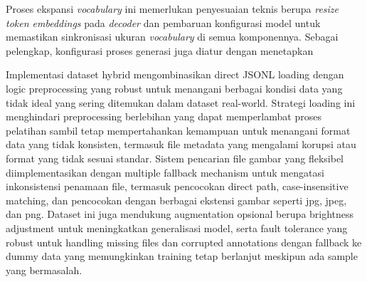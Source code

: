  
Proses ekspansi \textit{vocabulary} ini memerlukan penyesuaian teknis berupa \textit{resize token embeddings} pada \textit{decoder} dan pembaruan konfigurasi model untuk memastikan sinkronisasi ukuran \textit{vocabulary} di semua komponennya. Sebagai pelengkap, konfigurasi proses generasi juga diatur dengan menetapkan 



Implementasi dataset hybrid mengombinasikan direct JSONL loading dengan logic preprocessing yang robust untuk menangani berbagai kondisi data yang tidak ideal yang sering ditemukan dalam dataset real-world. Strategi loading ini menghindari preprocessing berlebihan yang dapat memperlambat proses pelatihan sambil tetap mempertahankan kemampuan untuk menangani format data yang tidak konsisten, termasuk file metadata yang mengalami korupsi atau format yang tidak sesuai standar. Sistem pencarian file gambar yang fleksibel diimplementasikan dengan multiple fallback mechanism untuk mengatasi inkonsistensi penamaan file, termasuk pencocokan direct path, case-insensitive matching, dan pencocokan dengan berbagai ekstensi gambar seperti jpg, jpeg, dan png. Dataset ini juga mendukung augmentation opsional berupa brightness adjustment untuk meningkatkan generalisasi model, serta fault tolerance yang robust untuk handling missing files dan corrupted annotations dengan fallback ke dummy data yang memungkinkan training tetap berlanjut meskipun ada sample yang bermasalah.


